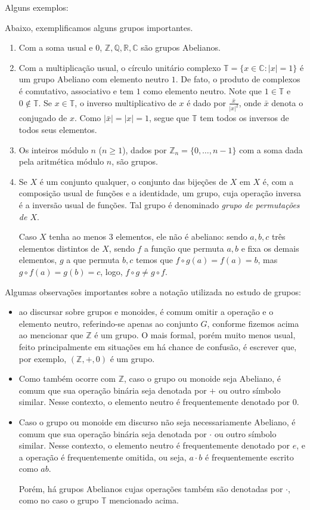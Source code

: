 Alguns exemplos:

\begin{exemplo}Abaixo, exemplificamos alguns grupos importantes.
    \begin{enumerate}[label=\alph*)]
        \item Com a soma usual e $0$, $\mathbb{Z, Q, R, C}$ são grupos Abelianos.
        \item Com a multiplicação usual, o círculo unitário complexo $\mathbb T=\{x \in \mathbb C: |x|=1\}$ é um grupo Abeliano com elemento neutro $1$.
        De fato, o produto de complexos é comutativo, associativo e tem $1$ como elemento neutro.
        Note que $1\in \mathbb T$ e $0\notin \mathbb T$.
        Se $x \in \mathbb T$, o inverso multiplicativo de $x$ é dado por $\frac{\bar x}{|x|^2}$, onde $\bar x$ denota o conjugado de $x$.
        Como $|\bar x|=|x|=1$, segue que $\mathbb T$ tem todos os inversos de todos seus elementos.
        \item Os inteiros módulo $n$ ($n\geq 1$), dados por $\mathbb Z_n=\{0, \dots, n-1\}$ com a soma dada pela aritmética módulo $n$, são grupos.
        \item Se $X$ é um conjunto qualquer, o conjunto das bijeções de $X$ em $X$ é, com a composição usual de funções e a identidade, um grupo, cuja operação inversa é a inversão usual de funções.
        Tal grupo é denominado \emph{grupo de permutações de $X$}.
        
        Caso $X$ tenha ao menos $3$ elementos, ele não é abeliano: sendo $a, b, c$ três elementos distintos de $X$, sendo $f$ a função que permuta $a, b$ e fixa os demais elementos, $g$ a que permuta $b, c$ temos que $f\circ g(a)=f(a)=b$, mas $g\circ f(a)=g(b)=c$, logo, $f\circ g\neq g\circ f$.
    \end{enumerate}
\end{exemplo}

Algumas observações importantes sobre a notação utilizada no estudo de grupos:
\begin{itemize}
\item ao discursar sobre grupos e monoides, é comum omitir a operação e o elemento neutro, referindo-se apenas ao conjunto $G$, conforme fizemos acima ao mencionar que $\mathbb Z$ é um grupo.
O mais formal, porém muito menos usual, feito principalmente em situações em há chance de confusão, é escrever que, por exemplo, $(\mathbb Z, +, 0)$ é um grupo.
\item Como também ocorre com $\mathbb Z$, caso o grupo ou monoide seja Abeliano, é comum que sua operação binária seja denotada por $+$ ou outro símbolo similar.
Nesse contexto, o elemento neutro é frequentemente denotado por $0$.
\item Caso o grupo ou monoide em discurso não seja necessariamente Abeliano, é comum que sua operação binária seja denotada por $\cdot$ ou outro símbolo similar.
Nesse contexto, o elemento neutro é frequentemente denotado por $e$, e a operação é frequentemente omitida, ou seja, $a \cdot b$ é frequentemente escrito como $ab$.

Porém, há grupos Abelianos cujas operações também são denotadas por $\cdot$, como no caso o grupo $\mathbb T$ mencionado acima.
\end{itemize}


